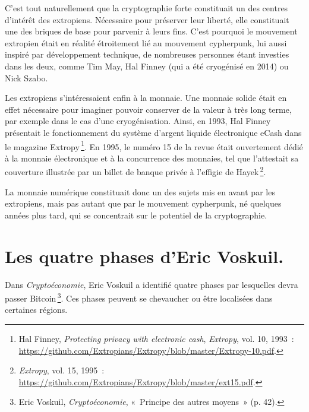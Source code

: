 \documentclass[a4paper,notitlepage]{article}
\renewenvironment{quote}{\small\list{}{\topsep=0.5\baselineskip}\item\relax}{\endlist} %
\newcommand{\eng}[1]{{\NoAutoSpaceBeforeFDP\emph{#1}}}  %
\newcommand{\sfootnote}{\,\footnote}
\begin{document}
C'est tout naturellement que la cryptographie forte constituait un des centres d'intérêt des extropiens. Nécessaire pour préserver leur liberté, elle constituait une des briques de base pour parvenir à leurs fins. C'est pourquoi le mouvement extropien était en réalité étroitement lié au mouvement cypherpunk, lui aussi inspiré par développement technique, de nombreuses personnes étant investies dans les deux, comme Tim May, Hal Finney (qui a été cryogénisé en 2014) ou Nick Szabo.

Les extropiens s'intéressaient enfin à la monnaie. Une monnaie solide était en effet nécessaire pour imaginer pouvoir conserver de la valeur à très long terme, par exemple dans le cas d'une cryogénisation. Ainsi, en 1993, Hal Finney présentait le fonctionnement du système d'argent liquide électronique eCash dans le magazine Extropy\sfootnote{Hal Finney, \eng{Protecting privacy with electronic cash}, \eng{Extropy}, vol. 10, 1993~: \url{https://github.com/Extropians/Extropy/blob/master/Extropy-10.pdf}.}. En 1995, le numéro 15 de la revue était ouvertement dédié à la monnaie électronique et à la concurrence des monnaies, tel que l'attestait sa couverture illustrée par un billet de banque privée à l'effigie de Hayek\sfootnote{\eng{Extropy}, vol. 15, 1995~: \url{https://github.com/Extropians/Extropy/blob/master/ext15.pdf}.}.

La monnaie numérique constituait donc un des sujets mis en avant par les extropiens, mais pas autant que par le mouvement cypherpunk, né quelques années plus tard, qui se concentrait sur le potentiel de la cryptographie.


\section{Les quatre phases d'Eric Voskuil.}

Dans \emph{Cryptoéconomie}, Eric Voskuil a identifié quatre phases par lesquelles devra passer Bitcoin\sfootnote{Eric Voskuil, \emph{Cryptoéconomie}, «~Principe des autres moyens~» (p. 42).}. Ces phases peuvent se chevaucher ou être localisées dans certaines régions.
\end{document}
